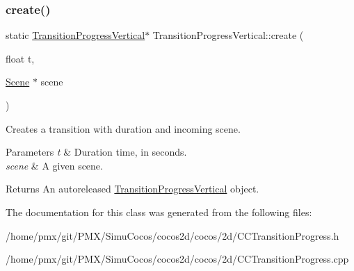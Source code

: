 \subsubsection{\texorpdfstring{create()}{create()}\hspace{0.1cm}{\footnotesize\ttfamily [2/2]}}
{\footnotesize\ttfamily static \hyperlink{classTransitionProgressVertical}{Transition\+Progress\+Vertical}$\ast$ Transition\+Progress\+Vertical\+::create (\begin{DoxyParamCaption}\item[{float}]{t,  }\item[{\hyperlink{classScene}{Scene} $\ast$}]{scene }\end{DoxyParamCaption})\hspace{0.3cm}{\ttfamily [static]}}

Creates a transition with duration and incoming scene.


\begin{DoxyParams}{Parameters}
{\em t} & Duration time, in seconds. \\
\hline
{\em scene} & A given scene. \\
\hline
\end{DoxyParams}
\begin{DoxyReturn}{Returns}
An autoreleased \hyperlink{classTransitionProgressVertical}{Transition\+Progress\+Vertical} object. 
\end{DoxyReturn}


The documentation for this class was generated from the following files\+:\begin{DoxyCompactItemize}
\item 
/home/pmx/git/\+P\+M\+X/\+Simu\+Cocos/cocos2d/cocos/2d/C\+C\+Transition\+Progress.\+h\item 
/home/pmx/git/\+P\+M\+X/\+Simu\+Cocos/cocos2d/cocos/2d/C\+C\+Transition\+Progress.\+cpp\end{DoxyCompactItemize}
